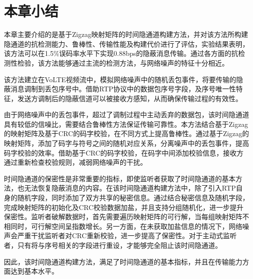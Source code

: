 \section{本章小结}
\label{chap:zigzag:summary}

本章主要介绍的是基于Zigzag映射矩阵的时间隐通道构建方法，并对该方法所构建隐通道的抗检测能力、鲁棒性、传输性能及构建代价进行了评估，实验结果表明，该方法可以在1.5\%误码率水平下实现0.88bps的隐蔽消息传输。通过各方面的抗检测性检验，该方法能够通过主流的检测方法，与网络噪声的特征十分相近。

该方法建立在VoLTE视频流中，模拟网络噪声中的随机丢包事件，将要传输的隐蔽消息调制到丢包序号中。借助RTP协议中的数据包序号字段，及序号唯一性特征，发送方调制后的隐蔽信道可以被接收方感知，从而确保传输过程的有效性。

由于网络噪声中的丢包事件，超过了调制过程中主动丢弃的数据包，该时间隐通道具有较低的信噪比，需要结合鲁棒性方法保证传输可靠性。本方法结合基于Zigzag的映射矩阵及基于CRC的码字校验，在不同方式上提高鲁棒性。通过基于Zigzag的映射矩阵，添加了码字与符号之间的随机对应关系，分离噪声中的丢包事件，提高码字校验的效率。借助基于CRC的码字校验，在码字中间添加校验信息，接收方通过重新检查校验规则，减弱网络噪声的干扰。

时间隐通道的保密性是非常重要的指标，即使监听者获取了时间隐通道的基本方法，也无法恢复隐蔽消息的内容。在该时间隐通道构建方法中，除了引入RTP自身的随机字段，同时添加了双方共享的秘密信息。通过结合秘密信息及随机字段，完成映射矩阵的初始化及CRC校验数据加盐，并且支持分组随机化，进一步提升保密性。监听者破解数据时，首先需要遍历映射矩阵的可行解，当每组映射矩阵不相同时，可行解空间呈指数增长。另一方面，在未获取加盐信息的情况下，网络噪声会严重干扰监听者对CRC重新校验，进一步提高了保密性。对于主动式监听者，只有将与序号相关的字段进行重设，才能够完全阻止该时间隐通道。

因此，该时间隐通道构建方法，满足了时间隐通道的基本指标，并且在传输能力方面达到基本水平。